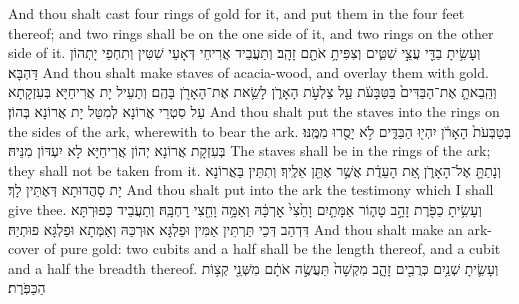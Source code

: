 {And thou shalt cast four rings of gold for it, and put them in the four feet thereof; and two rings shall be on the one side of it, and two rings on the other side of it.}{}
{וְעָשִׂ֥יתָ בַדֵּ֖י עֲצֵ֣י שִׁטִּ֑ים וְצִפִּיתָ֥ אֹתָ֖ם זָהָֽב׃
}
{וְתַעֲבֵיד אֲרִיחֵי דְּאָעֵי שִׁטִּין וְתִחְפֵי יָתְהוֹן דַּהְבָּא׃}
{And thou shalt make staves of acacia-wood, and overlay them with gold.}{}
{וְהֵֽבֵאתָ֤ אֶת־הַבַּדִּים֙ בַּטַּבָּעֹ֔ת עַ֖ל צַלְעֹ֣ת הָאָרֹ֑ן לָשֵׂ֥את אֶת־הָאָרֹ֖ן בָּהֶֽם׃}
{וְתַעֵיל יָת אֲרִיחַיָּא בְּעִזְקָתָא עַל סִטְרֵי אֲרוֹנָא לְמִטַּל יָת אֲרוֹנָא בְּהוֹן׃}
{And thou shalt put the staves into the rings on the sides of the ark, wherewith to bear the ark.}{}
{בְּטַבְּעֹת֙ הָאָרֹ֔ן יִהְי֖וּ הַבַּדִּ֑ים לֹ֥א יָסֻ֖רוּ מִמֶּֽנּוּ׃
}
{בְּעִזְקָת אֲרוֹנָא יְהוֹן אֲרִיחַיָּא לָא יִעְדּוֹן מִנֵּיהּ׃}
{The staves shall be in the rings of the ark; they shall not be taken from it.}{}
{וְנָתַתָּ֖ אֶל־הָאָרֹ֑ן אֵ֚ת הָעֵדֻ֔ת אֲשֶׁ֥ר אֶתֵּ֖ן אֵלֶֽיךָ׃
}
{וְתִתֵּין בַּאֲרוֹנָא יָת סָהֲדוּתָא דְּאֶתֵּין לָךְ׃}
{And thou shalt put into the ark the testimony which I shall give thee.}{}
{וְעָשִׂ֥יתָ כַפֹּ֖רֶת זָהָ֣ב טָה֑וֹר אַמָּתַ֤יִם וָחֵ֙צִי֙ אׇרְכָּ֔הּ וְאַמָּ֥ה וָחֵ֖צִי רׇחְבָּֽהּ׃
}
{וְתַעֲבֵיד כָּפוּרְתָּא דִּדְהַב דְּכֵי תַּרְתֵּין אַמִּין וּפַלְגָּא אוּרְכַּהּ וְאַמְּתָא וּפַלְגָּא פוּתְיַהּ׃}
{And thou shalt make an ark-cover of pure gold: two cubits and a half shall be the length thereof, and a cubit and a half the breadth thereof.}{}
{וְעָשִׂ֛יתָ שְׁנַ֥יִם כְּרֻבִ֖ים זָהָ֑ב מִקְשָׁה֙ תַּעֲשֶׂ֣ה אֹתָ֔ם מִשְּׁנֵ֖י קְצ֥וֹת הַכַּפֹּֽרֶת׃
}
